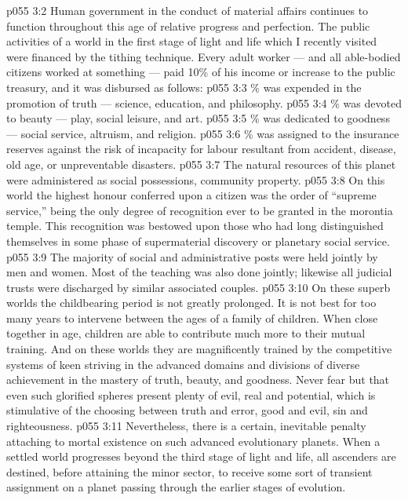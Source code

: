 \vs p055 3:2 \pc Human government in the conduct of material affairs continues to function throughout this age of relative progress and perfection. The public activities of a world in the first stage of light and life which I recently visited were financed by the tithing technique. Every adult worker --- and all able\hyp{}bodied citizens worked at something --- paid 10\% of his income or increase to the public treasury, and it was disbursed as follows:
\vs p055 3:3 \% was expended in the promotion of truth --- science, education, and philosophy.
\vs p055 3:4 \% was devoted to beauty --- play, social leisure, and art.
\vs p055 3:5 \% was dedicated to goodness --- social service, altruism, and religion.
\vs p055 3:6 \% was assigned to the insurance reserves against the risk of incapacity for labour resultant from accident, disease, old age, or unpreventable disasters.
\vs p055 3:7 \pc The natural resources of this planet were administered as social possessions, community property.
\vs p055 3:8 On this world the highest honour conferred upon a citizen was the order of “supreme service,” being the only degree of recognition ever to be granted in the morontia temple. This recognition was bestowed upon those who had long distinguished themselves in some phase of supermaterial discovery or planetary social service.
\vs p055 3:9 The majority of social and administrative posts were held jointly by men and women. Most of the teaching was also done jointly; likewise all judicial trusts were discharged by similar associated couples.
\vs p055 3:10 \pc On these superb worlds the childbearing period is not greatly prolonged. It is not best for too many years to intervene between the ages of a family of children. When close together in age, children are able to contribute much more to their mutual training. And on these worlds they are magnificently trained by the competitive systems of keen striving in the advanced domains and divisions of diverse achievement in the mastery of truth, beauty, and goodness. Never fear but that even such glorified spheres present plenty of evil, real and potential, which is stimulative of the choosing between truth and error, good and evil, sin and righteousness.
\vs p055 3:11 Nevertheless, there is a certain, inevitable penalty attaching to mortal existence on such advanced evolutionary planets. When a settled world progresses beyond the third stage of light and life, all ascenders are destined, before attaining the minor sector, to receive some sort of transient assignment on a planet passing through the earlier stages of evolution.
